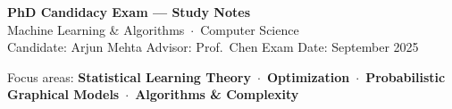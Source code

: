 \documentclass[10pt, letterpaper]{article}
\begin{document}
\begin{tcolorbox}[
  enhanced,
  colback=accent,
  coltext=white,
  colframe=accent,
  arc=4pt,
  boxrule=0pt,
  left=10pt, right=10pt, top=8pt, bottom=8pt
]
  {\large\bfseries PhD Candidacy Exam — Study Notes}\\[3pt]
  {\normalsize Machine Learning \& Algorithms\ $\cdot$\ Computer Science}\\[2pt]
  {\small\color{white!80!accent} Candidate: Arjun Mehta\quad
   Advisor: Prof.\ Chen\quad
   Exam Date: September 2025}
\end{tcolorbox}

\vspace{6pt}
{\small\color{neutral}
  Focus areas: \textbf{Statistical Learning Theory}\ $\cdot$\
  \textbf{Optimization}\ $\cdot$\
  \textbf{Probabilistic Graphical Models}\ $\cdot$\
  \textbf{Algorithms \& Complexity}
}






\end{document}
